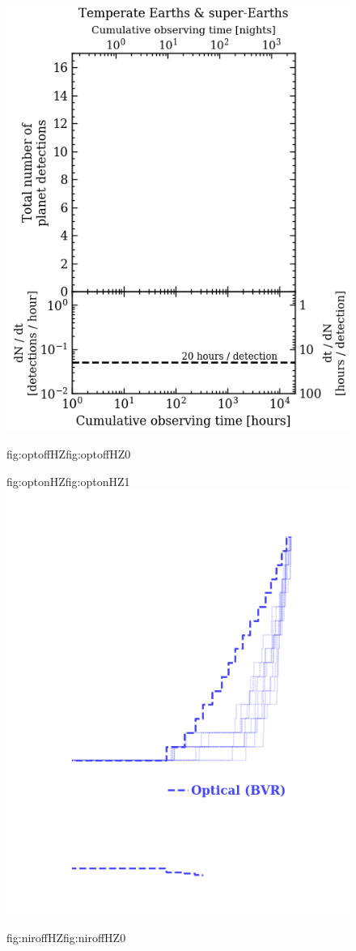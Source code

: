 \begin{figure}
  \centering
  \includegraphics[width=0.6\hsize]{figures/cumulativetobsGP_HZ_bkgd.png}%
  \hspace{-0.6\hsize}%
  \begin{ocg}{fig:optoffHZ}{fig:optoffHZ}{0}%
  \end{ocg}%
  \begin{ocg}{fig:optonHZ}{fig:optonHZ}{1}%
  \includegraphics[width=0.6\hsize]{figures/cumulativetobsGP_HZ_opt.png}%
  \end{ocg}
  \hspace{-0.6\hsize}%
  \begin{ocg}{fig:niroffHZ}{fig:niroffHZ}{0}%
  \end{ocg}%

\end{figure}

